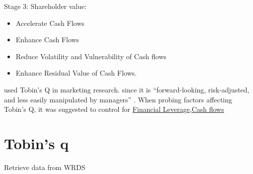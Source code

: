 \documentclass[
]{book}
\providecommand{\tightlist}{%
  \setlength{\itemsep}{0pt}\setlength{\parskip}{0pt}}
\begin{document}
Stage 3: Shareholder value:

\begin{itemize}
\tightlist
\item
  Accelerate Cash Flows
\item
  Enhance Cash Flows
\item
  Reduce Volatility and Vulnerability of Cash flows
\item
  Enhance Residual Value of Cash Flows.
\end{itemize}

\citep{Grewal_2010, McAlister_2016, Morgan_2009} used Tobin's Q in marketing research. since it is ``forward-looking,
risk-adjusted, and less easily manipulated by managers'' \citep{Wies_2019}. When probing factors affecting Tobin's Q, it was
suggested to control for \protect\hyperlink{financial-leverage}{Financial Leverage},\protect\hyperlink{cash-flows}{Cash flows}

\hypertarget{tobins-q}{%
\section{Tobin's q}\label{tobins-q}}

Retrieve data from WRDS
\end{document}
